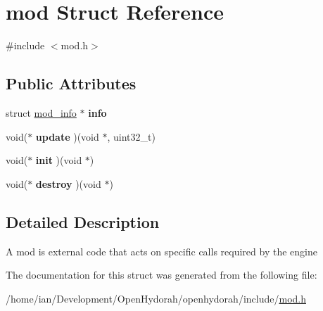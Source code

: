 \hypertarget{structmod}{\section{mod Struct Reference}
\label{structmod}
}


{\ttfamily \#include $<$mod.\-h$>$}

\subsection*{Public Attributes}
\begin{DoxyCompactItemize}
\item 
\hypertarget{structmod_ae8129978a10c607a5ad15ebe3a4662e4}{struct \hyperlink{structmod__info}{mod\-\_\-info} $\ast$ {\bfseries info}}\label{structmod_ae8129978a10c607a5ad15ebe3a4662e4}

\item 
\hypertarget{structmod_a400fdaf01464c186e33fa51c5308cff3}{void($\ast$ {\bfseries update} )(void $\ast$, uint32\-\_\-t)}\label{structmod_a400fdaf01464c186e33fa51c5308cff3}

\item 
\hypertarget{structmod_ae2f31ac5482ea62a25397efbf96d490f}{void($\ast$ {\bfseries init} )(void $\ast$)}\label{structmod_ae2f31ac5482ea62a25397efbf96d490f}

\item 
\hypertarget{structmod_a61c5c9cf061dcf6dbf447bbbfc7735d9}{void($\ast$ {\bfseries destroy} )(void $\ast$)}\label{structmod_a61c5c9cf061dcf6dbf447bbbfc7735d9}

\end{DoxyCompactItemize}


\subsection{Detailed Description}
A mod is external code that acts on specific calls required by the engine 

The documentation for this struct was generated from the following file\-:\begin{DoxyCompactItemize}
\item 
/home/ian/\-Development/\-Open\-Hydorah/openhydorah/include/\hyperlink{mod_8h}{mod.\-h}\end{DoxyCompactItemize}
